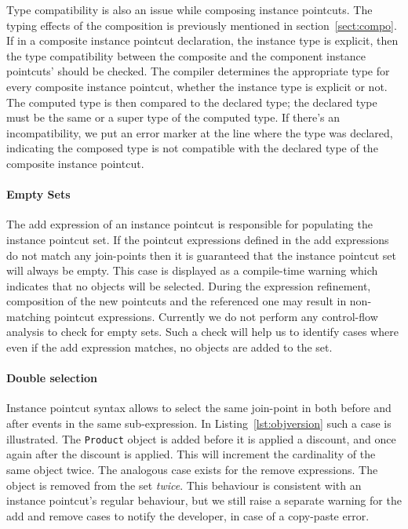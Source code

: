 \documentclass[10pt]{sigplanconf}
\newcommand{\lstinln}[1]{\lstinline~#1~}
\begin{document}
Type compatibility is also an issue while composing instance pointcuts. The typing effects of the composition is previously mentioned in section~\ref{sect:compo}. If in a composite instance pointcut declaration, the instance type is explicit, then the type compatibility between the composite and the component instance pointcuts' should be checked. The compiler determines the appropriate type for every composite instance pointcut, whether the instance type is explicit or not. The computed type is then compared to the declared type; the declared type must be the same or a super type of the computed type. If there's an incompatibility, we put an error marker at the line where the type was declared, indicating the composed type is not compatible with the declared type of the composite instance pointcut.


\paragraph*{Empty Sets} The add expression of an instance pointcut is responsible for populating the instance pointcut set. If the pointcut expressions defined in the add expressions do not match any join-points then it is guaranteed that the instance pointcut set will always be empty. This case is displayed as a compile-time warning which indicates that no objects will be selected. During the expression refinement, composition of the new pointcuts and the referenced one may result in non-matching pointcut expressions.
Currently we do not perform any control-flow analysis to check for empty sets. Such a check will help us to identify cases where even if the add expression matches, no objects are added to the set.

\paragraph*{Double selection} Instance pointcut syntax allows to select the same join-point in both before and after events in the same sub-expression. In Listing~\ref{lst:objversion} such a case is illustrated. The \lstinln{Product} object is added before it is applied a discount, and once again after the discount is applied. This will increment the cardinality of the same object twice. The analogous case exists for the remove expressions. The object is removed from the set \emph{twice}. This behaviour is consistent with an instance pointcut's regular behaviour, but we still raise a separate warning for the add and remove cases to notify the developer, in case of a copy-paste error.
\end{document}
